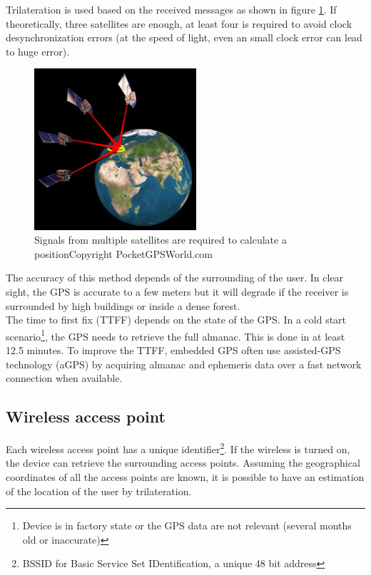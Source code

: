 Trilateration is used based on the received messages as shown in figure \ref{fig:gps-earth}.
If theoretically, three satellites are enough, at least four is required to avoid clock desynchronization errors (at the speed of light, even an small clock error can lead to huge error).\\

\begin{figure}[h]
  \centering
  \includegraphics[width=6cm]{images/gps.jpg}
  \caption{Signals from multiple satellites are required to calculate a position\newline Copyright PocketGPSWorld.com}
  \label{fig:gps-earth}
\end{figure}


The accuracy of this method depends of the surrounding of the user.
In clear sight, the GPS is accurate to a few meters but it will degrade if the receiver is surrounded by high buildings or inside a dense forest.\\

The time to first fix (TTFF) depends on the state of the GPS.
In a cold start scenario\footnote{Device is in factory state or the GPS data are not relevant (several months old or inaccurate)}, the GPS needs to retrieve the full almanac.
This is done in at least 12.5 minutes\cite{gpsuser}.
To improve the TTFF, embedded GPS often use assisted-GPS technology (aGPS) by acquiring almanac and ephemeris data over a fast network connection when available.

\subsection{Wireless access point}
Each wireless access point has a unique identifier\footnote{BSSID for Basic Service Set IDentification, a unique 48 bit address}.
If the wireless is turned on, the device can retrieve the surrounding access points.
Assuming the geographical coordinates of all the access points are known, it is possible to have an estimation of the location of the user by trilateration.\\

